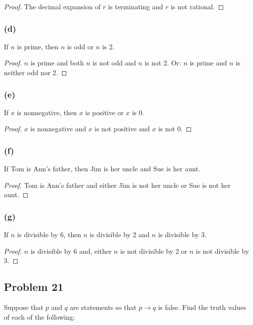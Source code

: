 \documentclass[14pt]{extarticle}
\begin{document}
\begin{proof}
The decimal expansion of $r$ is terminating and $r$ is not rational.
\end{proof}

\subsubsection{(d)}
If $n$ is prime, then $n$ is odd or $n$ is 2.

\begin{proof}
$n$ is prime and both $n$ is not odd and $n$ is not 2. Or: $n$ is prime and $n$
is neither odd nor 2.
\end{proof}

\subsubsection{(e)}
If $x$ is nonnegative, then $x$ is positive or $x$ is 0.

\begin{proof}
$x$ is nonnegative and $x$ is not positive and $x$ is not 0.
\end{proof}

\subsubsection{(f)}
If Tom is Ann’s father, then Jim is her uncle and Sue is her aunt.

\begin{proof}
Tom is Ann’s father and either Jim is not her uncle or Sue is not her aunt.
\end{proof}

\subsubsection{(g)}
If $n$ is divisible by 6, then $n$ is divisible by 2 and $n$ is divisible by 3.

\begin{proof}
$n$ is divisible by 6 and, either $n$ is not divisible by 2 or $n$ is not
divisible by 3.
\end{proof}

\subsection{Problem 21}
Suppose that $p$ and $q$ are statements so that $p \to q$ is false. Find the
truth values of each of the following:
\end{document}
